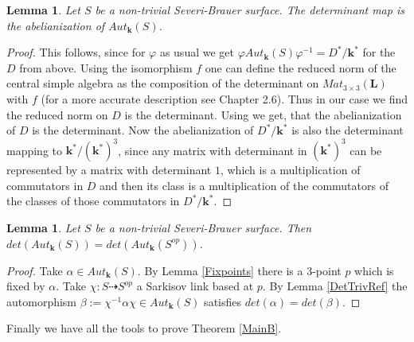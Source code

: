 \documentclass[12pt, oneside, reqno]{amsart}
\newtheorem{lemma}[theorem]{Lemma}
\begin{document}
\begin{lemma} \label{AutAbel}
    Let $S$ be a non-trivial Severi-Brauer surface. The determinant map is the abelianization of $Aut_{\textbf{k}}(S)$.
\end{lemma}
\begin{proof}
    This follows, since for $\varphi$ as usual we get $\varphi Aut_{\textbf{k}}(S) \varphi^{-1} = D^*/\textbf{k}^*$ for the $D$ from above. Using the isomorphism $f$ one can define the reduced norm of the central simple algebra as the composition of the determinant on $Mat_{3 \times 3}(\textbf{L})$ with $f$ (for a more accurate description see \cite{Gille_Szamuely_2006} Chapter 2.6). Thus in our case we find the reduced norm on $D$ is the determinant. Using \cite{Wang} we get, that the abelianization of $D$ is the determinant. Now the abelianization of $D^*/\textbf{k}^*$ is also the determinant mapping to $\textbf{k}^*/(\textbf{k}^*)^3$, since any matrix with determinant in $(\textbf{k}^*)^3$ can be represented by a matrix with determinant $1$, which is a multiplication of commutators in $D$ and then its class is a multiplication of the commutators of the classes of those commutators in $D^*/\textbf{k}^*$. 
\end{proof}
\begin{lemma} \label{ImageDET}
    Let $S$ be a non-trivial Severi-Brauer surface. Then $det(Aut_{\textbf{k}}(S)) = det(Aut_{\textbf{k}}(S^{op}))$.
\end{lemma}
\begin{proof}
    Take $\alpha \in Aut_{\textbf{k}}(S)$. By Lemma \ref{Fixpoints} there is a $3$-point $p$ which is fixed by $\alpha$. Take $\chi: S \dashrightarrow S^{op}$ a Sarkisov link based at $p$. By Lemma \ref{DetTrivRef} the automorphism $\beta := \chi^{-1} \alpha \chi \in Aut_{\textbf{k}}(S)$ satisfies $det(\alpha) = det(\beta)$.
\end{proof}
\noindent Finally we have all the tools to prove Theorem \ref{MainB}.
\end{document}
